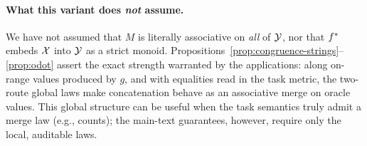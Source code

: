 \paragraph{What this variant does \emph{not} assume.} We have not assumed that $M$ is literally associative on \emph{all} of $\mathcal{Y}$, nor that $f^{\ast}$ embeds $\mathcal{X}$ into $\mathcal{Y}$ as a strict monoid. Propositions~\ref{prop:congruence-strings}–\ref{prop:odot} assert the exact strength warranted by the applications: along on-range values produced by $g$, and with equalities read in the task metric, the two-route global laws make concatenation behave as an associative merge on oracle values. This global structure can be useful when the task semantics truly admit a merge law (e.g., counts); the main-text guarantees, however, require only the local, auditable laws.



